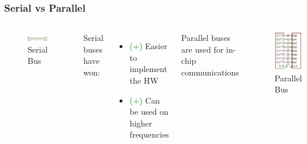\begin{frame}
  \frametitle{Serial vs Parallel}
  \begin{columns}
      \begin{figure}
        \centering
        \includegraphics[scale=0.45]{images/serial-bus.png}
        \caption{Serial Bus}
      \end{figure}
      Serial buses have won:
      \begin{itemize}
        \item[] \textcolor{green}{(+)} Easier to implement the HW
        \item[] \textcolor{green}{(+)} Can be used on higher frequencies
      \end{itemize}
      Parallel buses are used for in-chip communications
      \begin{figure}
        \centering
        \includegraphics[scale=0.45]{images/parallel-bus.png}
        \caption{Parallel Bus}
      \end{figure}
  \end{columns}
\end{frame}

